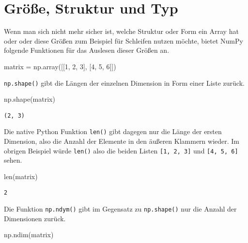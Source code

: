 \documentclass[
  letterpaper,
  DIV=11,
  numbers=noendperiod]{scrreprt}
\newenvironment{Shaded}{\begin{snugshade}}{\end{snugshade}}
\newcommand{\BuiltInTok}[1]{\textcolor[rgb]{0.00,0.23,0.31}{#1}}
\newcommand{\DecValTok}[1]{\textcolor[rgb]{0.68,0.00,0.00}{#1}}
\newcommand{\NormalTok}[1]{\textcolor[rgb]{0.00,0.23,0.31}{#1}}
\newcommand{\OperatorTok}[1]{\textcolor[rgb]{0.37,0.37,0.37}{#1}}
\begin{document}
\chapter{Größe, Struktur und Typ}\label{gruxf6uxdfe-struktur-und-typ}

Wenn man sich nicht mehr sicher ist, welche Struktur oder Form ein Array
hat oder oder diese Größen zum Beispiel für Schleifen nutzen möchte,
bietet NumPy folgende Funktionen für das Auslesen dieser Größen an.

\begin{Shaded}
\begin{Highlighting}[]
\NormalTok{matrix }\OperatorTok{=}\NormalTok{ np.array([[}\DecValTok{1}\NormalTok{, }\DecValTok{2}\NormalTok{, }\DecValTok{3}\NormalTok{], [}\DecValTok{4}\NormalTok{, }\DecValTok{5}\NormalTok{, }\DecValTok{6}\NormalTok{]])}
\end{Highlighting}
\end{Shaded}

\texttt{np.shape()} gibt die Längen der einzelnen Dimension in Form
einer Liste zurück.

\begin{Shaded}
\begin{Highlighting}[]
\NormalTok{np.shape(matrix)}
\end{Highlighting}
\end{Shaded}

\begin{verbatim}
(2, 3)
\end{verbatim}

Die native Python Funktion \texttt{len()} gibt dagegen nur die Länge der
ersten Dimension, also die Anzahl der Elemente in den äußeren Klammern
wieder. Im obrigen Beispiel würde \texttt{len()} also die beiden Listen
\texttt{{[}1,\ 2,\ 3{]}} und \texttt{{[}4,\ 5,\ 6{]}} sehen.

\begin{Shaded}
\begin{Highlighting}[]
\BuiltInTok{len}\NormalTok{(matrix)}
\end{Highlighting}
\end{Shaded}

\begin{verbatim}
2
\end{verbatim}

Die Funktion \texttt{np.ndym()} gibt im Gegensatz zu \texttt{np.shape()}
nur die Anzahl der Dimensionen zurück.

\begin{Shaded}
\begin{Highlighting}[]
\NormalTok{np.ndim(matrix)}
\end{Highlighting}
\end{Shaded}
\end{document}
